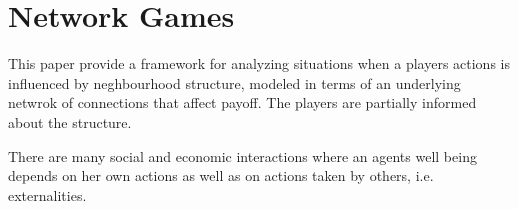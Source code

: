 \chapter{Network Games}
\label{chp:networkgames} 

This paper \cite{networkgames} provide a framework for analyzing situations when a players actions is influenced by neghbourhood structure, modeled in terms of an underlying netwrok of connections that affect payoff.
The players are partially informed about the structure. 

There are many social and economic interactions where an agents well being depends on her own actions as well as on actions taken by others, i.e. externalities. 
